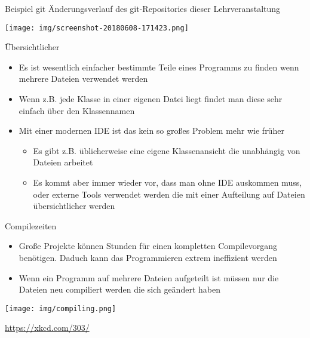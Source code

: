 \documentclass[presentation]{beamer}
\begin{document}
\begin{frame}[label={sec:orgf7cdbdc}]{Beispiel git}
Änderungsverlauf des git-Repositories dieser Lehrveranstaltung
\begin{center}
\texttt{[image: img/screenshot-20180608-171423.png]}
\end{center}
\end{frame}
\begin{frame}[label={sec:org3058372}]{Übersichtlicher}
\begin{itemize}
\item Es ist wesentlich einfacher bestimmte Teile eines Programms zu
finden wenn mehrere Dateien verwendet werden
\item Wenn z.B. jede Klasse in einer eigenen Datei liegt findet man diese
sehr einfach über den Klassennamen
\item Mit einer modernen IDE ist das kein so großes Problem mehr wie früher
\begin{itemize}
\item Es gibt z.B. üblicherweise eine eigene Klassenansicht die
unabhängig von Dateien arbeitet
\item Es kommt aber immer wieder vor, dass man ohne IDE auskommen muss,
oder externe Tools verwendet werden die mit einer Aufteilung auf
Dateien übersichtlicher werden
\end{itemize}
\end{itemize}
\end{frame}
\begin{frame}[label={sec:org8316992}]{Compilezeiten}
\begin{itemize}
\item Große Projekte können \alert{Stunden} für einen kompletten Compilevorgang
benötigen. Daduch kann das Programmieren extrem ineffizient werden
\item Wenn ein Programm auf mehrere Dateien aufgeteilt ist müssen nur die
Dateien neu compiliert werden die sich \alert{geändert} haben
\end{itemize}
\begin{center}
\texttt{[image: img/compiling.png]}
\end{center}
\tiny \center
\url{https://xkcd.com/303/}
\end{frame}
\end{document}
